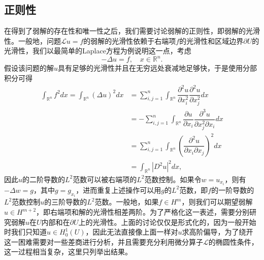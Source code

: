 \documentclass[a4paper,10pt]{ctexart}
\begin{document}
\subsection{正则性}
在得到了弱解的存在性和唯一性之后，我们需要讨论弱解的正则性，即弱解的光滑性。一般地，问题$ \mathcal{L}u=f $的弱解的光滑性依赖于右端项$ f $的光滑性和区域边界$ \partial U $的光滑性，我们以最简单的Laplace方程为例说明这一点，考虑
\[
    -\Delta u = f,\quad x\in \mathbb{R}^n.
\]
假设该问题的解$ u $具有足够的光滑性并且在无穷远处衰减地足够快，于是使用分部积分可得
\[
    \begin{aligned}
        \int_{\mathbb{R}^n} f^2 dx = \int_{\mathbb{R}^n} (\Delta u)^2 dx &= \sum_{i,j=1}^n \int_{\mathbb{R}^n} \dfrac{\partial^2 u}{\partial x_i^2} \dfrac{\partial^2 u}{\partial x_j^2} dx \\
        &= -\sum_{i,j=1}^n \int_{\mathbb{R}^n} \dfrac{\partial u}{\partial x_i} \dfrac{\partial^3 u}{\partial x_j^2 \partial x_i} dx \\
        &= \sum_{i,j=1}^n \int_{\mathbb{R}^n} \left( \dfrac{\partial^2 u}{\partial x_i\partial x_j} \right)^2 dx\\
        &= \int_{\mathbb{R}^n} |D^2 u|^2 dx,
    \end{aligned}
\]
因此$ u $的二阶导数的$ L^2 $范数可以被右端项的$ L^2 $范数控制。如果令$ w = u_{x_i} $，则有$ -\Delta w = g $，其中$ g = g_{x_i} $，进而重复上述操作可以用$ g $的$ L^2 $范数，即$ f $的一阶导数的$ L^2 $范数控制$ u $的三阶导数的$ L^2 $范数。一般地，如果$ f\in H^m $，则我们可以期望弱解$ u\in H^{m+2} $，即右端项和解的光滑性相差两阶。为了严格化这一表述，需要分别研究弱解$ u $在$ U $内部和在$ \partial U $上的光滑性。上面的讨论仅仅是形式化的，因为一般开始时我们只知道$ u\in H^1_0(U) $，因此无法直接像上面一样对$ u $求高阶偏导，为了绕开这一困难需要对一些差商进行分析，并且需要充分利用微分算子$ \mathcal{L} $的椭圆性条件，这一过程相当复杂，这里只列举出结果。
\end{document}
